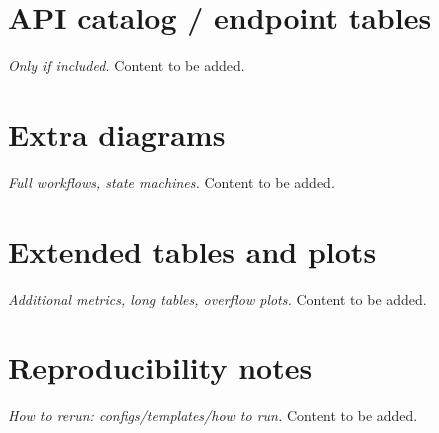 \documentclass[a4paper,twoside]{sapthesis}
\begin{document}
\section{API catalog / endpoint tables}
\label{app:api-catalog}
\emph{Only if included.} Content to be added.

\section{Extra diagrams}
\label{app:extra-diagrams}
\emph{Full workflows, state machines.} Content to be added.

\section{Extended tables and plots}
\label{app:extended-tables}
\emph{Additional metrics, long tables, overflow plots.} Content to be added.

\section{Reproducibility notes}
\label{app:reproducibility}
\emph{How to rerun: configs/templates/how to run.} Content to be added.


\backmatter

% 
% 
\end{document}
